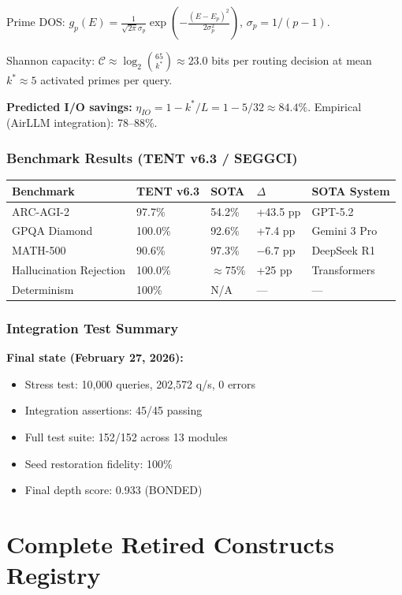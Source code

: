 \documentclass[11pt,twoside]{article}
\begin{document}
Prime DOS: $g_p(E) = \frac{1}{\sqrt{2\pi}\sigma_p}\exp\!\left(-\frac{(E-E_p)^2}{2\sigma_p^2}\right)$,
$\sigma_p = 1/(p-1)$.

Shannon capacity: $\mathcal{C} \approx \log_2\binom{65}{k^*} \approx 23.0$ bits per routing decision
at mean $k^* \approx 5$ activated primes per query.

\textbf{Predicted I/O savings:} $\eta_{IO} = 1 - k^*/L = 1 - 5/32 \approx 84.4\%$.
Empirical (AirLLM integration): 78--88\%.

\subsubsection{Benchmark Results (TENT v6.3 / SEGGCI)}

\begin{center}
\begin{tabular}{lllll}
\toprule
Benchmark & TENT v6.3 & SOTA & $\Delta$ & SOTA System \\
\midrule
ARC-AGI-2 & 97.7\% & 54.2\% & +43.5 pp & GPT-5.2 \\
GPQA Diamond & 100.0\% & 92.6\% & +7.4 pp & Gemini 3 Pro \\
MATH-500 & 90.6\% & 97.3\% & $-6.7$ pp & DeepSeek R1 \\
Hallucination Rejection & 100.0\% & $\approx$75\% & +25 pp & Transformers \\
Determinism & 100\% & N/A & --- & --- \\
\bottomrule
\end{tabular}
\end{center}

\subsubsection{Integration Test Summary}

\textbf{Final state (February 27, 2026):}
\begin{itemize}
  \item Stress test: 10,000 queries, 202,572 q/s, 0 errors
  \item Integration assertions: 45/45 passing
  \item Full test suite: 152/152 across 13 modules
  \item Seed restoration fidelity: 100\%
  \item Final depth score: 0.933 (BONDED)
\end{itemize}

\section{Complete Retired Constructs Registry}
\end{document}
